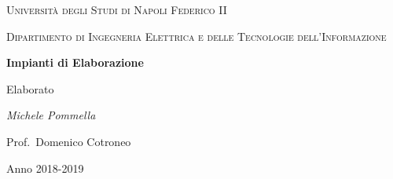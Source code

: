 \documentclass[a4paper,12pt]{book}
\begin{document}
	\begin{titlepage}
		\centering
		{\scshape\huge Università degli Studi di Napoli Federico II \par}
		\vspace{1cm}
		{\scshape\large Dipartimento di Ingegneria Elettrica e delle Tecnologie dell'Informazione\par}
		\vspace{0.5cm}
		
		\vspace{1.5cm}
		{\bfseries\huge Impianti di Elaborazione\par}
		\vspace{0.5cm}
		{\ttfamily\Large Elaborato\par}
		\vspace{2cm}
		{\Large\itshape Michele Pommella\par}
		\vspace{1.5cm}
		{\large Prof.~Domenico Cotroneo\par}
		
		\vfill
		
		{\large Anno 2018-2019\par}
	\end{titlepage}

\tableofcontents
\listoffigures

\mainmatter



\backmatter
\end{document}
